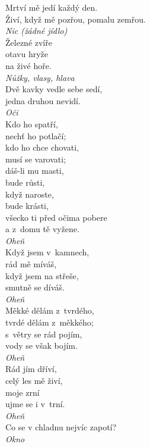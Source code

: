 \begin{multicols}{\value{columnsthindata}}
\noindent
Mrtví mě jedí každý den.\\
Živí, když mě pozřou, pomalu zemřou.\\[1 mm]
{\sl Nic (žádné jídlo)}\\

\noindent
Železné zvíře\\
otavu hryže\\
na živé hoře.\\[1 mm]
{\sl Nůžky, vlasy, hlava}\\

\noindent
Dvě kavky vedle sebe sedí,\\
jedna druhou nevidí.\\[1 mm]
{\sl Oči}\\

\noindent
Kdo ho spatří,\\
nechť ho potlačí;\\
kdo ho chce chovati,\\
musí se varovati;\\
dáš-li mu masti,\\
bude růsti,\\
když naroste,\\
bude krásti,\\
všecko ti před očima pobere\\
a z~domu tě vyžene.\\[1 mm]
{\sl Oheň}\\

\noindent
Když jsem v~kamnech,\\
rád mě míváš,\\
když jsem na střeše,\\
smutně se díváš.\\[1 mm]
{\sl Oheň}\\

\noindent
Měkké dělám z~tvrdého,\\
tvrdé dělám z~měkkého;\\
s~větry se rád pojím,\\
vody se však bojím.\\[1 mm]
{\sl Oheň}\\

\noindent
Rád jím dříví,\\
celý les mě živí,\\
moje zrní\\
ujme se i v~trní.\\[1 mm]
{\sl Oheň}\\

\noindent
Co se v chladnu nejvíc zapotí?\\[1 mm]
{\sl Okno}\\


\end{multicols}
